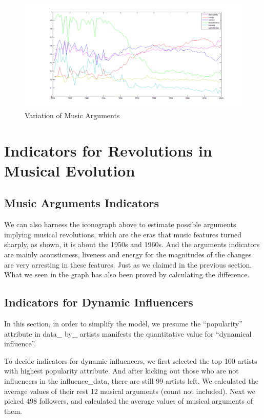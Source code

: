 \documentclass[12pt]{article}
\begin{document}
\begin{figure}[h]
\small
\centering
\includegraphics[width=12cm]{numbertrend.png}
\caption{Variation of Music Arguments}
\end{figure}


\section{Indicators for Revolutions in Musical Evolution}
\subsection{Music Arguments Indicators}
We can also harness the iconograph above to estimate possible arguments implying musical revolutions, which are the eras that music features turned sharply, as shown, it is about the 1950s and 1960s. And the arguments indicators are mainly acousticness, liveness and energy for the magnitudes of the changes are very arresting in these features. Just as we claimed in the previous section. What we seen in the graph has also been proved by calculating the difference.


\subsection{Indicators for Dynamic Influencers}\quad\;
In this section, in order to simplify the model, we presume the ``popularity'' attribute in data\_ by\_ artists manifests the quantitative value for ``dynamical influence''. 

To decide indicators for dynamic influencers, we first selected the top 100 
artists with highest popularity attribute. And after kicking out those who are not influencers in the influence\_data, there are still 99 artists left. We calculated the average values of their rest 12 musical arguments (count not included).
Next we picked 498 followers, and calculated the average values of musical arguments of them.
\end{document}
